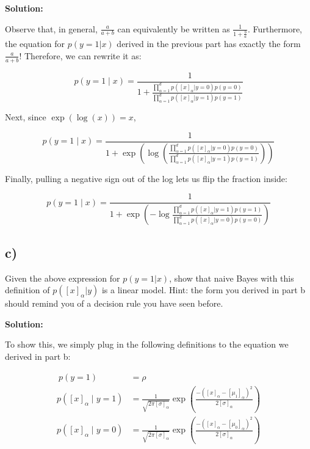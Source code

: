 \documentclass[a4paper]{article}
\begin{document}
\textbf{Solution:}



Observe that, in general, $\frac{a}{a+b}$ can equivalently be written as $\frac{1}{1+\frac{b}{a}}$. Furthermore, the equation for $p(y=1|x)$ derived in the previous part has exactly the form $\frac{a}{a+b}$! Therefore, we can rewrite it as:

\begin{equation*}
	p(y=1 \mid x)=\frac{1}{1+\frac{\prod_{\alpha=1}^{d} p([x]_{\alpha}|y=0)p(y=0)}{\prod_{\alpha=1}^{d} p([x]_{\alpha}|y=1)p(y=1)}}
\end{equation*}

Next, since $\exp(\log(x))=x$,

\begin{equation*}
	p(y=1 \mid x)=\frac{1}{1+\exp\left(\log\left(\frac{\prod_{\alpha=1}^{d} p([x]_{\alpha}|y=0)p(y=0)}{\prod_{\alpha=1}^{d} p([x]_{\alpha}|y=1)p(y=1)}\right)\right)}
\end{equation*}

Finally, pulling a negative sign out of the log lets us flip the fraction inside:

\begin{equation*}
p(y=1 \mid x) = \frac{1}{1+\exp{\left(-\log\frac{\prod_{\alpha=1}^{d} p([x]_{\alpha}|y=1)p(y=1)}{\prod_{\alpha=1}^{d} p([x]_{\alpha}|y=0)p(y=0)}\right)}}
\end{equation*}

\subsection*{c)}
Given the above expression for $p(y=1|x)$, show that naive Bayes with this definition of $p([x]_{\alpha}|y)$ is a linear model. Hint: the form you derived in part b should remind you of a decision rule you have seen before.


\textbf{Solution:}


To show this, we simply plug in the following definitions to the equation we derived in part b:

\begin{align*}\
p(y=1) &= \rho \\
p([x]_{\alpha} \mid y=1)&=\frac{1}{\sqrt{2\pi[\sigma]_{\alpha}}}\exp\left(\frac{-([x]_{\alpha}-[\mu_{1}]_{\alpha})^{2}}{2[\sigma]_{\alpha}}\right) \\
p([x]_{\alpha} \mid y=0)&=\frac{1}{\sqrt{2\pi[\sigma]_{\alpha}}}\exp\left(\frac{-([x]_{\alpha}-[\mu_{0}]_{\alpha})^{2}}{2[\sigma]_{\alpha}}\right)
\end{align*}
\end{document}
